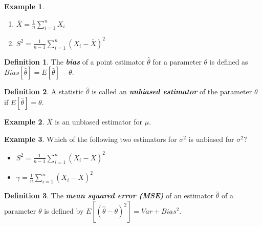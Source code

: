 \documentclass[
  11pt,
  oneside]{book}
\providecommand{\tightlist}{%
  \setlength{\itemsep}{0pt}\setlength{\parskip}{0pt}}
\theoremstyle{definition}
\newtheorem{definition}{Definition}[chapter]
\theoremstyle{definition}
\newtheorem{example}{Example}[chapter]
\theoremstyle{definition}
\theoremstyle{definition}
\theoremstyle{remark}
\begin{document}
\begin{example}
\leavevmode

\begin{enumerate}
\def\labelenumi{\arabic{enumi}.}
\item
  \(\bar{X} = \frac{1}{n} \sum_{i=1}^n X_i\)
\item
  \(S^2 = \frac{1}{n-1} \sum_{i=1}^n (X_i -\bar{X})^2\)
\end{enumerate}

\end{example}

\begin{definition}
The \textbf{\emph{bias}} of a point estimator \(\hat{\theta}\) for a parameter \(\theta\) is defined as \(Bias[\hat{\theta}] = E[\hat{\theta}] - \theta\).
\end{definition}

\begin{definition}
A statistic \(\hat{\theta}\) is called an \textbf{\emph{unbiased estimator}} of the parameter \(\theta\) if \(E[\hat{\theta}] = \theta\).
\end{definition}

\begin{example}
\(\bar{X}\) is an unbiased estimator for \(\mu\).
\end{example}

\begin{example}

Which of the following two estimators for \(\sigma^2\) is unbiased for \(\sigma^2\)?

\begin{itemize}
\tightlist
\item
  \(S^2 = \frac{1}{n-1} \sum_{i=1}^n (X_i -\bar{X})^2\)
\end{itemize}

\bigskip

\begin{itemize}
\tightlist
\item
  \(\gamma = \frac{1}{n} \sum_{i=1}^n (X_i -\bar{X})^2\)
\end{itemize}

\bigskip

\end{example}

\begin{definition}
The \textbf{\emph{mean squared error (MSE)}} of an estimator \(\hat{\theta}\) of a parameter \(\theta\) is defined by \(E[(\hat{\theta} - \theta)^2] = Var + Bias^2\).
\end{definition}
\end{document}
